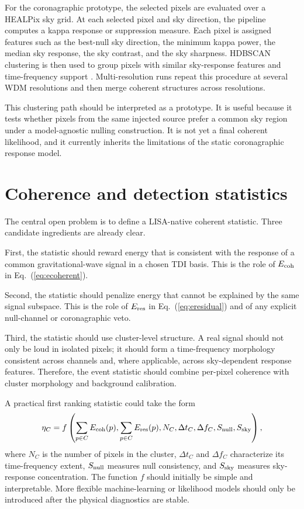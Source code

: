 \documentclass[%
 reprint,
 amsmath,amssymb,
 aps,
 prd,
]{revtex4-2}
\begin{document}
For the coronagraphic prototype, the selected pixels are evaluated over a HEALPix sky grid.  At each selected pixel and sky direction, the pipeline computes a kappa response or suppression measure.  Each pixel is assigned features such as the best-null sky direction, the minimum kappa power, the median sky response, the sky contrast, and the sky sharpness.  HDBSCAN clustering is then used to group pixels with similar sky-response features and time-frequency support \cite{Campello2013HDBSCAN,Campello2015HDBSCAN}.  Multi-resolution runs repeat this procedure at several WDM resolutions and then merge coherent structures across resolutions.

This clustering path should be interpreted as a prototype.  It is useful because it tests whether pixels from the same injected source prefer a common sky region under a model-agnostic nulling construction.  It is not yet a final coherent likelihood, and it currently inherits the limitations of the static coronagraphic response model.

\section{Coherence and detection statistics}
\label{sec:coherence}

The central open problem is to define a LISA-native coherent statistic.  Three candidate ingredients are already clear.

First, the statistic should reward energy that is consistent with the response of a common gravitational-wave signal in a chosen TDI basis.  This is the role of $E_{\rm coh}$ in Eq.~(\ref{eq:ecoherent}).

Second, the statistic should penalize energy that cannot be explained by the same signal subspace.  This is the role of $E_{\rm res}$ in Eq.~(\ref{eq:eresidual}) and of any explicit null-channel or coronagraphic veto.

Third, the statistic should use cluster-level structure.  A real signal should not only be loud in isolated pixels; it should form a time-frequency morphology consistent across channels and, where applicable, across sky-dependent response features.  Therefore, the event statistic should combine per-pixel coherence with cluster morphology and background calibration.

A practical first ranking statistic could take the form
\begin{equation}
\eta_C = f\left(
\sum_{p\in C} E_{\rm coh}(p),
\sum_{p\in C} E_{\rm res}(p),
N_C,
\Delta t_C,
\Delta f_C,
S_{\rm null},
S_{\rm sky}
\right),
\label{eq:ranking}
\end{equation}
where $N_C$ is the number of pixels in the cluster, $\Delta t_C$ and $\Delta f_C$ characterize its time-frequency extent, $S_{\rm null}$ measures null consistency, and $S_{\rm sky}$ measures sky-response concentration.  The function $f$ should initially be simple and interpretable.  More flexible machine-learning or likelihood models should only be introduced after the physical diagnostics are stable.
\end{document}
